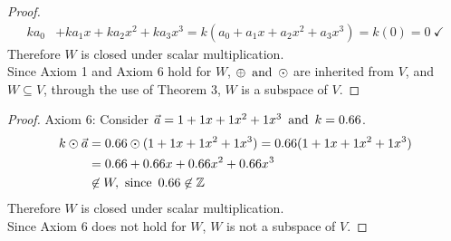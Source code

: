 \begin{enumerate}
\begin{proof}
\begin{align*}
      ka_0            & +ka_1x+ka_2x^2+ka_3x^3 = k(a_0+a_1x+a_2x^2+a_3x^3) = k(0) = 0~\checkmark
    \end{align*}
    Therefore $W$ is closed under scalar multiplication. \\
    Since Axiom 1 and Axiom 6 hold for $W$, $\oplus \operatorname{~\text{and}~} \odot$ are inherited from $V$, and $W \subseteq V$, through the use of Theorem 3, $W$ is a subspace of $V$.
  \end{proof}
  \begin{proof}
    Axiom 6: Consider $\vec{a} = 1+1x+1x^2+1x^3 \operatorname{~\text{and}~} k = 0.66$.
    \begin{align*}
      k \odot \vec{a} & = 0.66 \odot (1+1x+1x^2+1x^3) = 0.66(1+1x+1x^2+1x^3) \\
                      & = 0.66+0.66x+0.66x^2+0.66x^3                         \\
                      & \not \in W, \operatorname{~\text{since}~} 0.66 \not \in \mathbb{Z}             \\
    \end{align*}
    Therefore $W$ is  closed under scalar multiplication. \\
    Since Axiom 6 does not hold for $W$, $W$ is not a subspace of $V$.
  \end{proof}
\end{enumerate}

